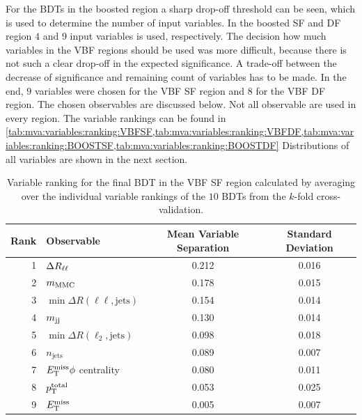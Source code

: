 For the BDTs in the boosted region a sharp drop-off threshold can be seen, which is used to determine the number
of input variables.
In the boosted SF and DF region $4$ and $9$ input variables is used, respectively.
The decision how much variables in the VBF regions should be used was more difficult, because there is not such a clear drop-off in the expected significance.
A trade-off between the decrease of significance and remaining count of variables has to be made.
In the end, $9$ variables were chosen for the VBF SF region and $8$ for the VBF DF region.
The chosen observables are discussed below.
Not all observable are used in every region.
The variable rankings can be found in \cref{tab:mva:variables:ranking:VBFSF,tab:mva:variables:ranking:VBFDF,tab:mva:variables:ranking:BOOSTSF,tab:mva:variables:ranking:BOOSTDF}
Distributions of all variables are shown in the next section.

\begin{table}[htpb]
    \centering
    \caption{Variable ranking for the final BDT in the VBF SF region calculated by averaging over the individual
             variable rankings of the $10$ BDTs from the $k$-fold cross-validation.}\label{tab:mva:variables:ranking:VBFSF}
    \begin{tabular}{rlcc}
        \toprule
        Rank & Observable & Mean Variable Separation & Standard Deviation \\ \midrule
        1 & $\Delta R_{\ell\ell}$ & 0.212 & 0.016 \\
        2 & $m_\text{MMC}$ & 0.178 & 0.015 \\
        3 & $\min \Delta R (\ell\ell, \text{jets})$ & 0.154 & 0.014 \\
        4 & $m_{\text{jj}}$ & 0.130 & 0.014 \\
        5 & $\min \Delta R (\ell_2, \text{jets})$ & 0.098 & 0.018 \\
        6 & $n_\text{jets}$ & 0.089 & 0.007 \\
        7 & $E_\text{T}^\text{miss} \phi$ centrality & 0.080 & 0.011 \\
        8 & $p_\text{T}^\text{total}$ & 0.053 & 0.025 \\
        9 & $E_\text{T}^\text{miss}$ & 0.005 & 0.007 \\
        \bottomrule
    \end{tabular}
\end{table}

